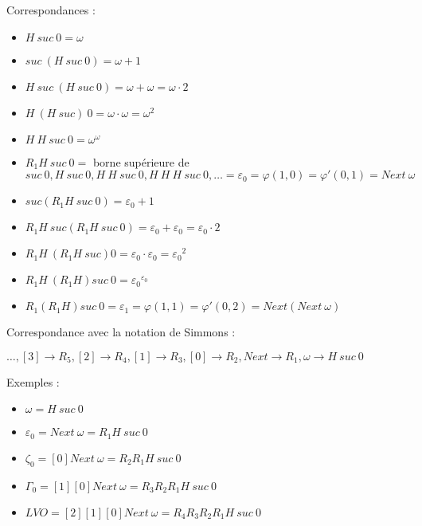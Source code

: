 \documentclass[12pt]{beamer}
\begin{document}
\begin{frame}

Correspondances :

\begin{itemize}
     \setlength{\itemsep}{1pt}
     \setlength{\parskip}{0pt}
     \setlength{\parsep}{0pt}

\item \( H\ suc\ 0 = \omega \)
\item \( suc\ (H\ suc\ 0) = \omega + 1 \)
\item \( H\ suc\ (H\ suc\ 0) = \omega + \omega = \omega \cdot 2 \)
\item \( H\ (H\ suc)\ 0 = \omega \cdot \omega = \omega^2 \)
\item \( H\ H\ suc\ 0 = \omega^\omega \)
\item \( R_1 H\ suc\ 0 = \) borne supérieure de \( suc\ 0, H\ suc\ 0, H\ H\ suc\ 0, H\ H\ H\ suc\ 0, \ldots = \varepsilon_0 = \varphi(1,0) = \varphi'(0,1) = Next\ \omega \)
\item \( suc (R_1 H\ suc\ 0) = \varepsilon_0 + 1 \)
\item \( R_1 H\ suc (R_1 H\ suc\ 0) = \varepsilon_0 + \varepsilon_0 = \varepsilon_0 \cdot 2 \)
\item \( R_1 H\ (R_1 H\ suc) 0 = \varepsilon_0 \cdot \varepsilon_0 = {\varepsilon_0}^2 \)
\item \( R_1 H\ (R_1 H) suc\ 0 = {\varepsilon_0}^{\varepsilon_0} \)
\item \( R_1 (R_1 H) suc\ 0 = \varepsilon_1 = \varphi(1,1) = \varphi'(0,2) = Next (Next\ \omega) \)

\end{itemize}

\end{frame}
\begin{frame}

Correspondance avec la notation de Simmons : 

\( \ldots, [3] \rightarrow R_5, [2] \rightarrow R_4, [1] \rightarrow R_3, [0] \rightarrow R_2, Next \rightarrow R_1, \omega \rightarrow H\ suc\ 0 \)

Exemples :

\begin{itemize}
     \setlength{\itemsep}{1pt}
     \setlength{\parskip}{0pt}
     \setlength{\parsep}{0pt}

\item \( \omega = H\ suc\ 0 \)
\item \( \varepsilon_0 = Next\ \omega = R_1 H\ suc\ 0 \)
\item \( \zeta_0 = [0] Next\ \omega = R_2 R_1 H\ suc\ 0 \)
\item \( \Gamma_0 = [1] [0] Next\ \omega = R_3 R_2 R_1 H\ suc\ 0 \)
\item \( LVO = [2] [1] [0] Next\ \omega = R_4 R_3 R_2 R_1 H\ suc\ 0 \)

\end{itemize}

\end{frame}
\end{document}
